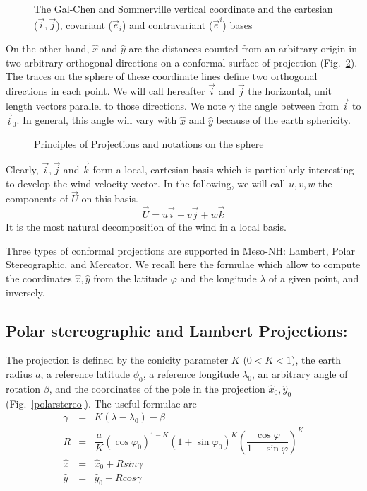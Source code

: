 \begin{figure}[hpbt]
\caption{The Gal-Chen and Sommerville vertical coordinate and the cartesian
($\vec{i},\vec{j}$), covariant ($\vec{e}_i$) and contravariant ($\vec{e}^i$)
bases \label{galchen}}
\end{figure}

On the other hand, $\widehat{x}$ and $\widehat{y}$
are the distances counted from an arbitrary origin in two arbitrary orthogonal
directions on a conformal surface of projection (Fig.~\ref{projection}).
The traces
on the sphere of these coordinate lines define two orthogonal directions
in each point.  We will call hereafter $\vec{i}$ and $\vec{j}$ the horizontal,
unit length vectors parallel to those directions.
We note $\gamma$ the angle between from $\vec{i}$ to
$\vec{i}_0$. In general, this angle will vary with $\widehat{x}$ and
$\widehat{y}$ because of the earth sphericity.

\begin{figure}[hpbt]
\caption{Principles of Projections and notations on the sphere
\label{projection}}
\end{figure}

Clearly, $\vec{i},\vec{j}$ and $\vec{k}$ form a local, cartesian basis
which is particularly interesting to develop the wind
velocity vector. In the following, we will call $ u ,  v , w$ the
components of ${\vec U}$ on this basis.
\begin{equation}
\vec{U}=u\vec{i}+v\vec{j}+w\vec{k}
\end{equation}
It is the most natural decomposition of the wind in a local basis.

Three types of conformal projections are supported in Meso-NH: Lambert, Polar
Stereographic, and Mercator. We recall here the formulae which allow to
compute the coordinates $\widehat{x},\widehat{y}$ from the latitude $\varphi$
and the longitude $\lambda$ of a given point, and inversely.

\subsection{Polar stereographic and Lambert Projections:}

The projection is defined by the conicity parameter $K$ ($0<K<1$), the
earth radius $a$,
a reference latitude $\phi_0$, a reference
longitude $\lambda_0$, an arbitrary angle of rotation $\beta$,
and the coordinates of the pole in the projection
$\widehat{x}_0, \widehat{y}_0$ (Fig.~\ref{polarstereo}).
The useful formulae are
\begin{eqnarray}
\gamma & = & K (\lambda - \lambda _{0}) - \beta \nonumber \\
R &  = & \dfrac{a}{K} (\cos\varphi _{0})^{1-K} (1 + \sin\varphi _{0})^{K}
\left(\dfrac{\cos\varphi }{1 + \sin\varphi}\right)^{K} \nonumber \\
\widehat{x}& = & \widehat{x}_0 + R sin\gamma \\
\widehat{y}& = & \widehat{y}_0 - R cos \gamma \nonumber
\end{eqnarray}

